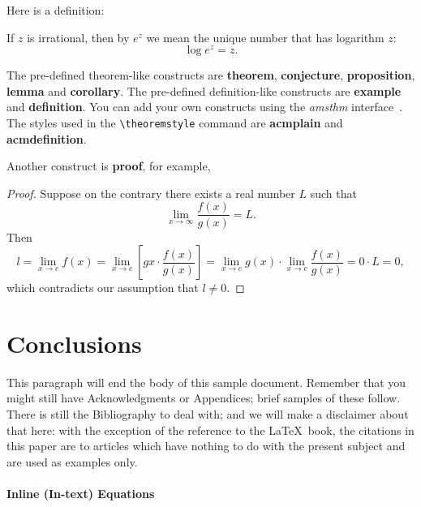 Here is a definition:
\begin{definition}
  If $z$ is irrational, then by $e^z$ we mean the
  unique number that has
  logarithm $z$:
  \begin{displaymath}
    \log e^z = z.
  \end{displaymath}
\end{definition}

The pre-defined theorem-like constructs are \textbf{theorem},
\textbf{conjecture}, \textbf{proposition}, \textbf{lemma} and
\textbf{corollary}.  The pre-defined de\-fi\-ni\-ti\-on-like constructs are
\textbf{example} and \textbf{definition}.  You can add your own
constructs using the \textsl{amsthm} interface~\cite{Amsthm15}.  The
styles used in the \verb|\theoremstyle| command are \textbf{acmplain}
and \textbf{acmdefinition}.

Another construct is \textbf{proof}, for example,

\begin{proof}
  Suppose on the contrary there exists a real number $L$ such that
  \begin{displaymath}
    \lim_{x\rightarrow\infty} \frac{f(x)}{g(x)} = L.
  \end{displaymath}
  Then
  \begin{displaymath}
    l=\lim_{x\rightarrow c} f(x)
    = \lim_{x\rightarrow c}
    \left[ g{x} \cdot \frac{f(x)}{g(x)} \right ]
    = \lim_{x\rightarrow c} g(x) \cdot \lim_{x\rightarrow c}
    \frac{f(x)}{g(x)} = 0\cdot L = 0,
  \end{displaymath}
  which contradicts our assumption that $l\neq 0$.
\end{proof}

\section{Conclusions}
This paragraph will end the body of this sample document.
Remember that you might still have Acknowledgments or
Appendices; brief samples of these
follow.  There is still the Bibliography to deal with; and
we will make a disclaimer about that here: with the exception
of the reference to the \LaTeX\ book, the citations in
this paper are to articles which have nothing to
do with the present subject and are used as
examples only.


\paragraph{Inline (In-text) Equations}
